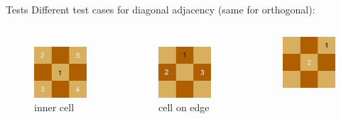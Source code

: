 \documentclass{beamer}
\begin{document}
\begin{frame}{Tests}
	Different test cases for diagonal adjacency (same for orthogonal):
\begin{columns}
	\begin{figure}
		\includegraphics[scale=0.15]{images/inner.png}
		\\inner cell
	\end{figure}
	\begin{figure}
		\includegraphics[scale=0.15]{images/edge.png}
		\\cell on edge
	\end{figure}
	\begin{figure}
	\includegraphics[scale=0.15]{images/corner.png}

\end{figure}
\end{columns}
\end{frame}
\end{document}
